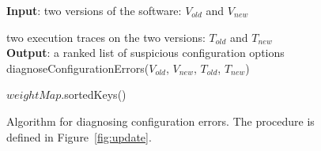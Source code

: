 \begin{figure}[t]
\textbf{Input}: two versions of the software: $\mathit{V_{old}}$ and $V_{new}$

\quad two execution traces on the two versions: $\mathit{T_{old}}$ and $T_{new}$\\
\textbf{Output}: a ranked list of suspicious configuration options\\
\vspace{-4mm}%
diagnoseConfigurationErrors($\mathit{V_{old}}$, $\mathit{V_{new}}$, $\mathit{T_{old}}$, $\mathit{T_{new}}$)\\
\begin{algorithmic}[1]
\STATE 
\RETURN $\mathit{weightMap}$.sortedKeys()
\end{algorithmic}
\caption{Algorithm for diagnosing configuration errors. The
procedure  is defined in Figure~\ref{fig:update}.
\label{fig:identify}
}
\end{figure}
